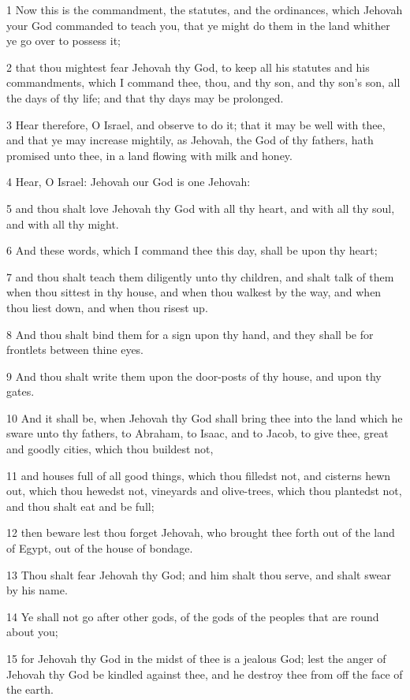 \par 1 Now this is the commandment, the statutes, and the ordinances, which Jehovah your God commanded to teach you, that ye might do them in the land whither ye go over to possess it;
\par 2 that thou mightest fear Jehovah thy God, to keep all his statutes and his commandments, which I command thee, thou, and thy son, and thy son's son, all the days of thy life; and that thy days may be prolonged.
\par 3 Hear therefore, O Israel, and observe to do it; that it may be well with thee, and that ye may increase mightily, as Jehovah, the God of thy fathers, hath promised unto thee, in a land flowing with milk and honey.
\par 4 Hear, O Israel: Jehovah our God is one Jehovah:
\par 5 and thou shalt love Jehovah thy God with all thy heart, and with all thy soul, and with all thy might.
\par 6 And these words, which I command thee this day, shall be upon thy heart;
\par 7 and thou shalt teach them diligently unto thy children, and shalt talk of them when thou sittest in thy house, and when thou walkest by the way, and when thou liest down, and when thou risest up.
\par 8 And thou shalt bind them for a sign upon thy hand, and they shall be for frontlets between thine eyes.
\par 9 And thou shalt write them upon the door-posts of thy house, and upon thy gates.
\par 10 And it shall be, when Jehovah thy God shall bring thee into the land which he sware unto thy fathers, to Abraham, to Isaac, and to Jacob, to give thee, great and goodly cities, which thou buildest not,
\par 11 and houses full of all good things, which thou filledst not, and cisterns hewn out, which thou hewedst not, vineyards and olive-trees, which thou plantedst not, and thou shalt eat and be full;
\par 12 then beware lest thou forget Jehovah, who brought thee forth out of the land of Egypt, out of the house of bondage.
\par 13 Thou shalt fear Jehovah thy God; and him shalt thou serve, and shalt swear by his name.
\par 14 Ye shall not go after other gods, of the gods of the peoples that are round about you;
\par 15 for Jehovah thy God in the midst of thee is a jealous God; lest the anger of Jehovah thy God be kindled against thee, and he destroy thee from off the face of the earth.
